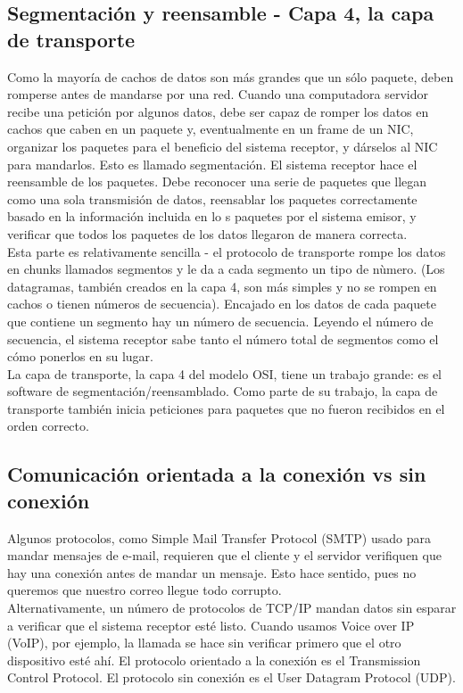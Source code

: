 \documentclass[12pt]{report}
\begin{document}
\subsection{Segmentación y reensamble - Capa 4, la capa de transporte}
Como la mayoría de cachos de datos son más grandes que un sólo paquete, deben
romperse antes de mandarse por una red.
Cuando una computadora servidor recibe una petición por algunos datos, debe ser
capaz de romper los datos en cachos que caben en un paquete y, eventualmente 
en un frame de un NIC, organizar los paquetes para el beneficio del sistema receptor, 
y dárselos al NIC para mandarlos. Esto es llamado segmentación. 
El sistema receptor hace el reensamble de los paquetes. Debe reconocer 
una serie de paquetes que llegan como una sola transmisión de datos, 
reensablar los paquetes correctamente basado en la información incluida en lo s
paquetes por el sistema emisor, y verificar que todos los paquetes de los datos
llegaron de manera correcta.\\
Esta parte es relativamente sencilla - el protocolo de transporte rompe los 
datos en chunks llamados segmentos y le da a cada segmento un tipo de nùmero.
(Los datagramas, también creados en la capa 4, son más simples y no se rompen en cachos
o tienen números de secuencia).
Encajado en los datos de cada paquete que contiene un segmento hay un número de secuencia.
Leyendo el número de secuencia, el sistema receptor sabe tanto el número total de segmentos 
como el cómo ponerlos en su lugar.\\
La capa de transporte, la capa 4 del modelo OSI, tiene un trabajo grande:
es el software de segmentación/reensamblado. Como parte de su trabajo,
la capa de transporte también inicia peticiones para paquetes que no fueron recibidos en el orden correcto.

\subsection{Comunicación orientada a la conexión vs sin conexión}
Algunos protocolos, como Simple Mail Transfer Protocol (SMTP) usado para 
mandar mensajes de e-mail, requieren que el cliente y el servidor verifiquen que hay
una conexión antes de mandar un mensaje. Esto hace sentido, pues no queremos que 
nuestro correo llegue todo corrupto.\\
Alternativamente, un número de protocolos de TCP/IP mandan datos sin esparar 
a verificar que el sistema receptor esté listo.
Cuando usamos Voice over IP (VoIP), por ejemplo, la llamada se hace sin verificar
primero que el otro dispositivo esté ahí.
El protocolo orientado a la conexión es el Transmission Control Protocol.
El protocolo sin conexión es el User Datagram Protocol (UDP).
\end{document}
